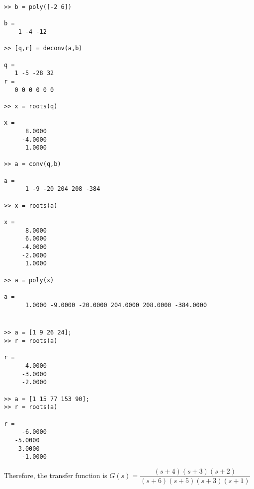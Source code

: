 \documentclass[../main.tex]{subfiles}
\begin{document}
\begin{enumerate}[label=\bfseries(\alph*)]
\begin{lstlisting}[numbers=none]
>> b = poly([-2 6])

b =
    1 -4 -12
 
>> [q,r] = deconv(a,b)

q =
   1 -5 -28 32
r =
   0 0 0 0 0 0

>> x = roots(q)

x =
	  8.0000
 	 -4.0000
 	  1.0000
 	
>> a = conv(q,b)

a =
	  1 -9 -20 204 208 -384
	 
>> x = roots(a)

x =
 	  8.0000
	  6.0000
 	 -4.0000
 	 -2.0000
 	  1.0000
 	
>> a = poly(x)

a =
 	  1.0000 -9.0000 -20.0000 204.0000 208.0000 -384.0000

\end{lstlisting}
\bigbreak

\section{}
\begin{lstlisting}[numbers=none]
>> a = [1 9 26 24];
>> r = roots(a)

r =
 	 -4.0000
	 -3.0000
 	 -2.0000
 	
>> a = [1 15 77 153 90];
>> r = roots(a)

r =
 	 -6.0000
   -5.0000
   -3.0000
 	 -1.0000
\end{lstlisting}
\bigbreak
Therefore, the transfer function is
\bigbreak
$G(s)=\dfrac{(s+4)(s+3)(s+2)}{(s+6)(s+5)(s+3)(s+1)}$
\bigbreak

\end{enumerate}
\end{document}
